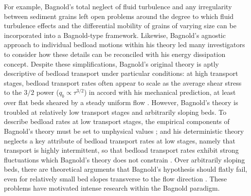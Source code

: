 \documentclass{article}
\begin{document}


For example, Bagnold's total neglect of fluid turbulence and any irregularity between sediment grains left open problems around the degree to which fluid turbulence effects and the differential mobility of grains of varying size can be incorporated into a Bagnold-type framework.  
Likewise, Bagnold's agnostic approach to individual bedload motions within his theory led many investigators to consider how these details can be reconciled with his energy dissipation concept. 
Despite these simplifications, Bagnold's original theory is aptly descriptive of bedload transport under particular conditions: at high transport stages, bedload transport rates often appear to scale as the average shear stress to the $3/2$ power ($q_b \propto \tau^{3/2}$) in accord with his mechanical prediction, at least over flat beds sheared by a steady uniform flow \citep{MeyerPeter1948,Gomez1989,Schmeeckle2014, Elghannay2017}. 
However, Bagnold's theory is troubled at relatively low transport stages and arbitrarily sloping beds.
To describe bedload rates at low transport stages, the empirical components of Bagnold's theory must be set to unphysical values \citep{Engelund1976, Luque1976,  Nelson1995, Nino1998}; and his deterministic theory neglects a key attribute of bedload transport rates at low stages, namely that transport is highly intermittent, so that bedload transport rates exhibit strong fluctuations which Bagnold's theory does not constrain \citep{Bohm2004, Ancey2008}. 
Over arbitrarily sloping beds, there are theoretical arguments that Bagnold's hypothesis should flatly fail, even for relatively small bed slopes transverse to the flow direction \citep{Seminara2002}. 
These problems have motivated intense research within the Bagnold paradigm. 
\end{document}
